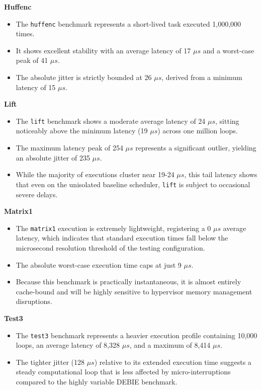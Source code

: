 \textbf{Huffenc}

\begin{itemize}
\item
  The \texttt{huffenc} benchmark represents a short-lived task executed
  1,000,000 times.
\item
  It shows excellent stability with an average latency of 17 $\mu s$ and a
  worst-case peak of 41 $\mu s$.
\item
  The absolute jitter is strictly bounded at 26 $\mu s$, derived from a
  minimum latency of 15 $\mu s$.
\end{itemize}

\textbf{Lift}

\begin{itemize}
\item
  The \texttt{lift} benchmark shows a moderate average latency of 24 $\mu s$,
  sitting noticeably above the minimum latency (19 $\mu s$) across one
  million loops.
\item
  The maximum latency peak of 254 $\mu s$ represents a significant outlier,
  yielding an absolute jitter of 235 $\mu s$.
\item
  While the majority of executions cluster near 19-24 $\mu s$, this tail
  latency shows that even on the unisolated baseline scheduler,
  \texttt{lift} is subject to occasional severe delays.
\end{itemize}

\textbf{Matrix1}

\begin{itemize}
\item
  The \texttt{matrix1} execution is extremely lightweight, registering a
  0 $\mu s$ average latency, which indicates that standard execution times
  fall below the microsecond resolution threshold of the testing
  configuration.
\item
  The absolute worst-case execution time caps at just 9 $\mu s$.
\item
  Because this benchmark is practically instantaneous, it is almost
  entirely cache-bound and will be highly sensitive to hypervisor memory
  management disruptions.
\end{itemize}

\textbf{Test3}

\begin{itemize}
\item
  The \texttt{test3} benchmark represents a heavier execution profile
  containing 10,000 loops, an average latency of 8,328 $\mu s$, and a maximum
  of 8,414 $\mu s$.
\item
  The tighter jitter (128 $\mu s$) relative to its extended execution time
  suggests a steady computational loop that is less affected by
  micro-interruptions compared to the highly variable DEBIE benchmark.
\end{itemize}

